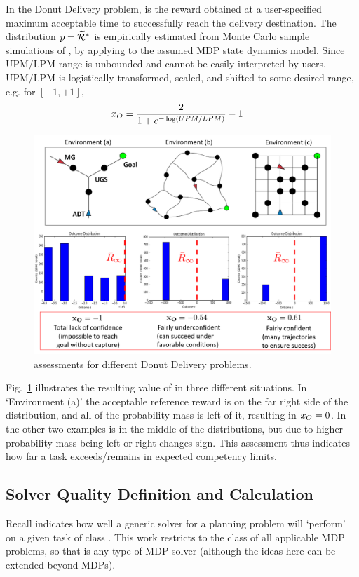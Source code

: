 In the Donut Delivery problem, \riref{} is the reward obtained at a user-specified maximum acceptable time to successfully reach the delivery destination. The distribution $p = \widetilde{\mathcal{R}}^*$ is empirically estimated from Monte Carlo sample simulations of \rwdopt, by applying \piopt{} to the assumed MDP state dynamics model. Since UPM/LPM range is unbounded %
and cannot be easily interpreted by users, UPM/LPM is logistically transformed, scaled, and shifted to some desired range, e.g. for $[-1,+1]$, 
    \begin{align}
        \xO &= \frac{2}{1+e^{-\log\left(\mbox{\tiny UPM/LPM}\right)}}-1 \label{eq:xO}
    \end{align}
    \begin{figure}[tbp]
        \centering
        \includegraphics[width=0.95\linewidth]{Figures/xO_EnvsRewardsOnly.png}
        \caption{\xO{} assessments for different Donut Delivery problems.}
        \label{fig:xOexample}
        \vspace{-0.5 cm}
    \end{figure}
\noindent Fig.~\ref{fig:xOexample} illustrates the resulting value of \xO{} in three different situations. In `Environment (a)' the acceptable reference reward \ris{} is on the far right side of the distribution, and all of the probability mass is left of it, resulting in $x_O=0$. In the other two examples \ris{} is in the middle of the distributions, but due to higher probability mass being left or right \xO{} changes sign. This assessment thus indicates how far a task exceeds/remains in expected competency limits. 

\subsection{Solver Quality Definition and Calculation} \label{sec:xQ}
Recall \xQ{} indicates how well a generic solver \solve{} for a planning problem will `perform' on a given task \task{} of class \taskclass{}. This work restricts \taskclass{} to the class of all applicable MDP problems, so that \solve{} is any type of MDP solver  (although the ideas here can be extended beyond MDPs).


